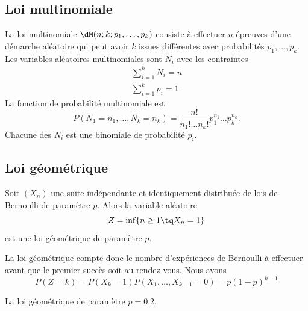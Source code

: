 \subsection{Loi multinomiale}

La loi multinomiale \( \dM(n;k;p_1,\ldots, p_k)\) consiste à effectuer \( n\) épreuves d'une démarche aléatoire qui peut avoir \( k\) issues différentes avec probabilités \( p_1,\ldots, p_k\). Les variables aléatoires multinomiales sont \( N_i\) avec les contraintes
\begin{subequations}
	\begin{align}
		\sum_{i=1}^kN_i=n \\
		\sum_{i=1}^kp_i=1.
	\end{align}
\end{subequations}
La fonction de probabilité multinomiale est
\begin{equation}
	P(N_1=n_1,\ldots, N_k=n_k)=\frac{ n! }{ n_1!\ldots n_k! }p_1^{n_1}\ldots p_k^{n_k}.
\end{equation}
Chacune des \( N_i\) est une binomiale de probabilité \( p_i\).

\subsection{Loi géométrique}

Soit \( (X_n)\) une suite indépendante et identiquement distribuée de lois de Bernoulli de paramètre \( p\). Alors la variable aléatoire
\begin{equation}
	Z=\inf\{ n\geq 1\tq X_n=1 \}
\end{equation}
est une loi géométrique de paramètre \( p\).

La loi géométrique compte donc le nombre d'expériences de Bernoulli à effectuer avant que le premier succès soit au rendez-vous. Nous avons
\begin{equation}
	P(Z=k)=P(X_k=1)P(X_1,\ldots,X_{k-1}=0)=p(1-p)^{k-1}
\end{equation}

La loi géométrique de paramètre \( p=0.2\).

